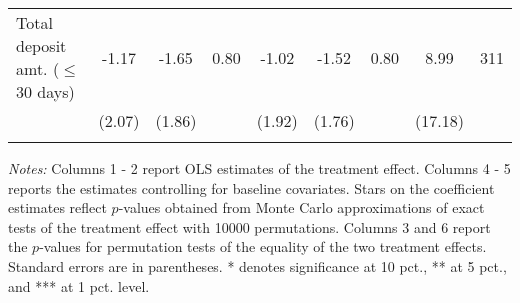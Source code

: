 \begin{table}[htbp]
{\begin{threeparttable}
\begin{tabular}{l*{8}{c}}
Total deposit amt. ($\leq$ 30 days)&    -1.17&    -1.65&     0.80&    -1.02&    -1.52&     0.80&     8.99&      311\\
          &   (2.07)&   (1.86)&         &   (1.92)&   (1.76)&         &  (17.18)&         \\
          &         &         &         &         &         &         &         &         \\
\bottomrule \end{tabular} \begin{tablenotes}[flushleft] \footnotesize \item \emph{Notes:} Columns 1 - 2 report OLS estimates of the treatment effect. Columns 4 - 5 reports the estimates controlling for baseline covariates. Stars on the coefficient estimates reflect \(p\)-values obtained from Monte Carlo approximations of exact tests of the treatment effect with 10000 permutations. Columns 3 and 6 report the \(p\)-values for permutation tests of the equality of the two treatment effects. Standard errors are in parentheses. * denotes significance at 10 pct., ** at 5 pct., and *** at 1 pct. level. \end{tablenotes} \end{threeparttable} } \end{table}

